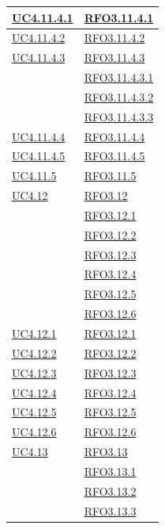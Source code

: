 \begin{itemize}
\begin{itemize}
\begin{itemize}
\begin{itemize}
\begin{longtable}{|>{\centering}m{5cm}|m{5cm}<{\centering}|}
\hyperref[UC4.11.4.1]{UC4.11.4.1} & \hyperlink{RFO3.11.4.1}{RFO3.11.4.1}\\ \hline
\hyperref[UC4.11.4.2]{UC4.11.4.2} & \hyperlink{RFO3.11.4.2}{RFO3.11.4.2}\\ \hline
\hyperref[UC4.11.4.3]{UC4.11.4.3} & \hyperlink{RFO3.11.4.3}{RFO3.11.4.3}\\
& \hyperlink{RFO3.11.4.3.1}{RFO3.11.4.3.1}\\
& \hyperlink{RFO3.11.4.3.2}{RFO3.11.4.3.2}\\
& \hyperlink{RFO3.11.4.3.3}{RFO3.11.4.3.3}\\ \hline
\hyperref[UC4.11.4.4]{UC4.11.4.4} & \hyperlink{RFO3.11.4.4}{RFO3.11.4.4}\\ \hline
\hyperref[UC4.11.4.5]{UC4.11.4.5} & \hyperlink{RFO3.11.4.5}{RFO3.11.4.5}\\ \hline

\hyperref[UC4.11.5]{UC4.11.5} & \hyperlink{RFO3.11.5}{RFO3.11.5}\\

\hyperref[UC4.12]{UC4.12} & \hyperlink{RFO3.12}{RFO3.12}\\ & \hyperlink{RFO3.12.1}{RFO3.12.1}\\
& \hyperlink{RFO3.12.2}{RFO3.12.2}\\
& \hyperlink{RFO3.12.3}{RFO3.12.3}\\
& \hyperlink{RFO3.12.4}{RFO3.12.4}\\
& \hyperlink{RFO3.12.5}{RFO3.12.5}\\
& \hyperlink{RFO3.12.6}{RFO3.12.6}\\ \hline

\hyperref[UC4.12.1]{UC4.12.1} & \hyperlink{RFO3.12.1}{RFO3.12.1}\\ \hline
\hyperref[UC4.12.2]{UC4.12.2} & \hyperlink{RFO3.12.2}{RFO3.12.2}\\ \hline
\hyperref[UC4.12.3]{UC4.12.3} & \hyperlink{RFO3.12.3}{RFO3.12.3}\\ \hline
\hyperref[UC4.12.4]{UC4.12.4} & \hyperlink{RFO3.12.4}{RFO3.12.4}\\ \hline
\hyperref[UC4.12.5]{UC4.12.5} & \hyperlink{RFO3.12.5}{RFO3.12.5}\\ \hline
\hyperref[UC4.12.6]{UC4.12.6} & \hyperlink{RFO3.12.6}{RFO3.12.6}\\ \hline

\hyperref[UC4.13]{UC4.13} & \hyperlink{RFO3.13}{RFO3.13}\\ & \hyperlink{RFO3.13.1}{RFO3.13.1}\\
& \hyperlink{RFO3.13.2}{RFO3.13.2}\\
& \hyperlink{RFO3.13.3}{RFO3.13.3}\\ \hline


\end{longtable}
\end{itemize}
\end{itemize}
\end{itemize}
\end{itemize}
